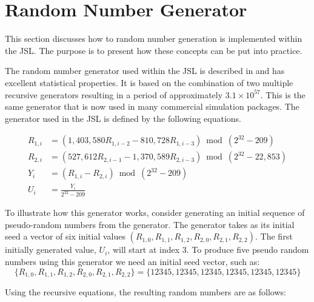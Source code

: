 \documentclass[
]{book}
\theoremstyle{definition}
\theoremstyle{definition}
\theoremstyle{definition}
\theoremstyle{definition}
\theoremstyle{remark}
\begin{document}
\hypertarget{ch2:generator}{%
\section{Random Number Generator}\label{ch2:generator}}

This section discusses how to random number generation is implemented
within the JSL. The purpose is to present how these concepts can be put into
practice.

The random number generator used within the JSL is described in
\citet{ecuyer2002an} and has excellent statistical properties. It is based on the
combination of two multiple recursive generators resulting in a period
of approximately \(3.1 \times 10^{57}\). This is the same generator that
is now used in many commercial simulation packages. The generator used in the JSL is
defined by the following equations.

\[
\begin{aligned}
R_{1,i} & = (1,403,580 R_{1,i-2} - 810,728 R_{1,i-3})\bmod (2^{32}-209)\\
R_{2,i} & = (527,612R_{2,i-1} - 1,370,589 R_{2,i-3})\bmod (2^{32}-22,853)\\
Y_i & = (R_{1,i}-R_{2,i})\bmod(2^{32}-209)\\
U_i & = \frac{Y_i}{2^{32}-209}
\end{aligned}
\]

To illustrate how this generator works, consider generating an initial sequence of
pseudo-random numbers from the generator. The generator takes as its
initial seed a vector of six initial values
\((R_{1,0}, R_{1,1}, R_{1,2}, R_{2,0}, R_{2,1}, R_{2,2})\). The first
initially generated value, \(U_{i}\), will start at index \(3\). To produce five pseudo random numbers using this generator we need an initial seed vector, such as:
\[\lbrace R_{1,0}, R_{1,1}, R_{1,2}, R_{2,0}, R_{2,1}, R_{2,2} \rbrace = \lbrace 12345, 12345, 12345, 12345, 12345, 12345\rbrace\]

Using the recursive equations, the resulting random numbers are as follows:
\end{document}
